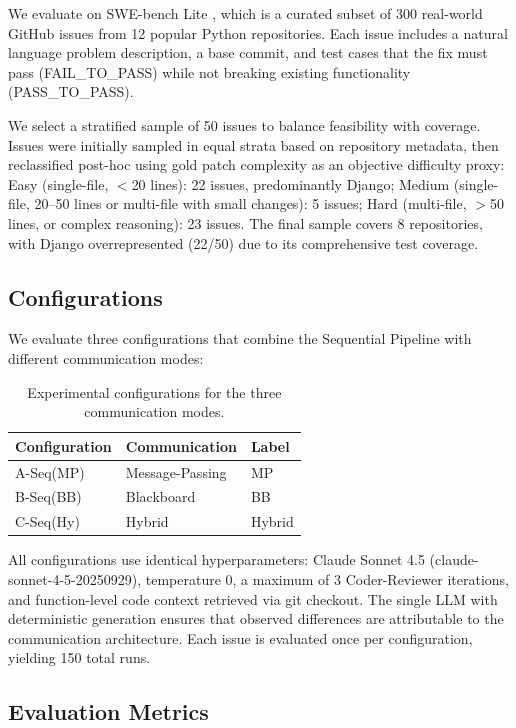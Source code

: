 \documentclass{ieeeaccess}
\begin{document}
We evaluate on SWE-bench Lite \cite{jimenez2024swebench}, which is a curated subset of 300 real-world GitHub issues from 12 popular Python repositories. Each issue includes a natural language problem description, a base commit, and test cases that the fix must pass (FAIL\_TO\_PASS) while not breaking existing functionality (PASS\_TO\_PASS).

We select a stratified sample of 50 issues to balance feasibility with coverage. Issues were initially sampled in equal strata based on repository metadata, then reclassified post-hoc using gold patch complexity as an objective difficulty proxy: Easy (single-file, $<$20 lines): 22 issues, predominantly Django; Medium (single-file, 20--50 lines or multi-file with small changes): 5 issues; Hard (multi-file, $>$50 lines, or complex reasoning): 23 issues. The final sample covers 8 repositories, with Django overrepresented (22/50) due to its comprehensive test coverage.

\subsection{Configurations}

We evaluate three configurations that combine the Sequential Pipeline with different communication modes:

\begin{table}[!ht]
\centering
\caption{Experimental configurations for the three communication modes.}
\label{tab:configurations}
\begin{tabular}{lll}
\toprule
\textbf{Configuration} & \textbf{Communication} & \textbf{Label} \\
\midrule
A-Seq(MP) & Message-Passing & MP \\
B-Seq(BB) & Blackboard & BB \\
C-Seq(Hy) & Hybrid & Hybrid \\
\bottomrule
\end{tabular}
\end{table}

All configurations use identical hyperparameters: Claude Sonnet 4.5 (claude-sonnet-4-5-20250929), temperature 0, a maximum of 3 Coder-Reviewer iterations, and function-level code context retrieved via git checkout. The single LLM with deterministic generation ensures that observed differences are attributable to the communication architecture. Each issue is evaluated once per configuration, yielding 150 total runs.

\subsection{Evaluation Metrics}
\end{document}
